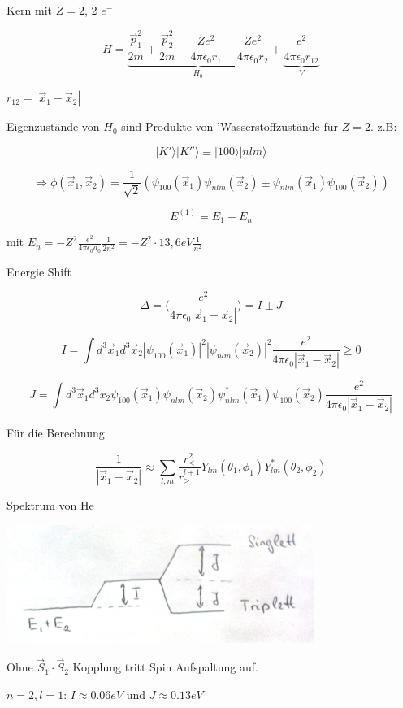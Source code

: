Kern mit \(Z=2\), 2 \(e^-\)

\[H = \underbrace{\frac{\vec p_1^2}{2m}+ \frac{\vec p_2^2}{2m}-\frac{Ze^2}{4\pi \epsilon_0 r_1} -\frac{Ze^2}{4\pi \epsilon_0 r_2}}_{H_0}+\underbrace{\frac{e^2}{4\pi\epsilon_0 r_{12}}}_{V}\]

\(r_{12}=|\vec x_1-\vec x_2|\)

Eigenzustände von \(H_0\) sind Produkte von 'Wasserstoffzustände für \(Z=2\). z.B:

\[|K'\rangle |K''\rangle \equiv |100\rangle |nlm\rangle \]

\[\Rightarrow \phi(\vec x_1,\vec x_2) = \frac{1}{\sqrt{2}}(\psi_{100}(\vec x_1)\psi_{nlm}(\vec x_2)\pm \psi_{nlm}(\vec x_1)\psi_{100}(\vec x_2) ) \]

\[E^{(1)} = E_1+E_n \]

mit \(E_n = -Z^2\frac{e^2}{4\pi\epsilon_0 a_0}\frac{1}{2n^2}=-Z^2\cdot 13,6 eV\frac{1}{n^2}\)

Energie Shift

\[\Delta = \langle \frac{e^2}{4\pi\epsilon_0|\vec x_1-\vec x_2|} \rangle = I\pm J \]

\[I = \int d^3\vec x_1 d^3\vec x_2 |\psi_{100}(\vec x_1)|^2 |\psi_{nlm}(\vec x_2)|^2 \frac{e^2}{4\pi\epsilon_0|\vec x_1-\vec x_2|} \geq 0\]


\[J=\int d^3 \vec x_1 d^3 x_2\psi_{100}(\vec x_1)\psi_{nlm}(\vec x_2) \psi_{nlm}^*(\vec x_1)\psi_{100}(\vec x_2)\frac{e^2}{4\pi\epsilon_0|\vec x_1-\vec x_2|}\]

Für die Berechnung

\[\frac{1}{|\vec x_1-\vec x_2|}\approx \sum_{l,m}\frac{r^2_<}{r^{l+1}_>}Y_{lm}(\theta_1,\phi_1)Y_{lm}^*(\theta_2,\phi_2)\]

Spektrum von He


\includegraphics[width=0.75\textwidth]{kap04_01.png}

Ohne \(\vec S_1\cdot \vec S_2\) Kopplung tritt Spin Aufspaltung auf.

\(n=2,l=1\): \(I\approx 0.06eV\) und \(J\approx 0.13eV\)




